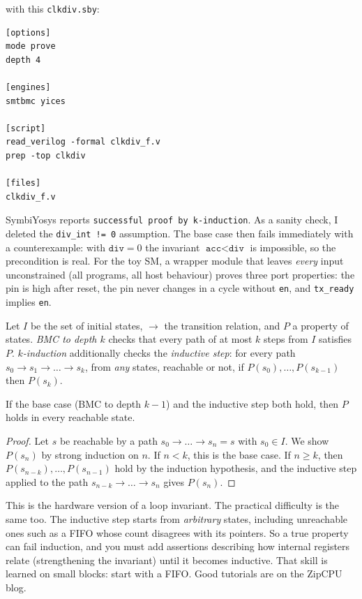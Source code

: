 with this \texttt{clkdiv.sby}:
\begin{verbatim}
[options]
mode prove
depth 4

[engines]
smtbmc yices

[script]
read_verilog -formal clkdiv_f.v
prep -top clkdiv

[files]
clkdiv_f.v
\end{verbatim}
SymbiYosys reports \texttt{successful proof by k-induction}. As a sanity
check, I deleted the \texttt{div\_int != 0} assumption. The base case then
fails immediately with a counterexample: with $\texttt{div}=0$ the invariant
$\texttt{acc}<\texttt{div}$ is impossible, so the precondition is real. For the
toy SM, a wrapper module that leaves \emph{every} input unconstrained (all
programs, all host behaviour) proves three port properties: the pin is high
after reset, the pin never changes in a cycle without \texttt{en}, and
\texttt{tx\_ready} implies \texttt{en}.

\begin{definition}
Let $I$ be the set of initial states, $\to$ the transition relation, and $P$
a property of states. \emph{BMC to depth $k$} checks that every path of at
most $k$ steps from $I$ satisfies $P$. \emph{$k$-induction} additionally
checks the \emph{inductive step}: for every path
$s_0\to s_1\to\dots\to s_k$, from \emph{any} states, reachable or not, if
$P(s_0),\dots,P(s_{k-1})$ then $P(s_k)$.
\end{definition}

\begin{theorem}
If the base case (BMC to depth $k-1$) and the inductive step both hold, then
$P$ holds in every reachable state.
\end{theorem}
\begin{proof}
Let $s$ be reachable by a path $s_0\to\dots\to s_n=s$ with $s_0\in I$. We
show $P(s_n)$ by strong induction on $n$. If $n<k$, this is the base case.
If $n\ge k$, then $P(s_{n-k}),\dots,P(s_{n-1})$ hold by the induction
hypothesis, and the inductive step applied to the path
$s_{n-k}\to\dots\to s_n$ gives $P(s_n)$.
\end{proof}

This is the hardware version of a loop invariant. The practical difficulty
is the same too. The inductive step starts from \emph{arbitrary} states,
including unreachable ones such as a FIFO whose count disagrees with its
pointers. So a true property can fail induction, and you must add
assertions describing how internal registers relate (strengthening the
invariant) until it becomes inductive. That skill is learned on small
blocks: start with a FIFO. Good tutorials are on the ZipCPU blog.

